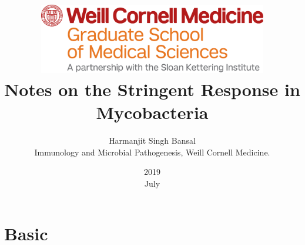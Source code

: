 \documentclass[12t, oneside]{book}
\title{\includegraphics[width=10cm]{logo.png}\\[6cm] Notes on the Stringent Response in Mycobacteria\\[1cm]}
\date{2019 \\ July}
\author{Harmanjit Singh Bansal \\[1cm] Immunology and Microbial Pathogenesis, Weill Cornell Medicine.}
\begin{document}
\frontmatter
	\maketitle

\mainmatter
    \part{Basic}
        
%         
%         
%         
%         
%         
%         
%         
%         
\end{document}
